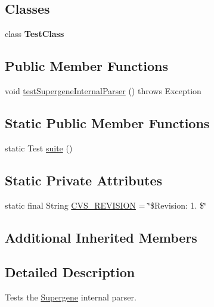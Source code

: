 \subsection*{Classes}
\begin{DoxyCompactItemize}
\item 
class {\bfseries Test\-Class}
\end{DoxyCompactItemize}
\subsection*{Public Member Functions}
\begin{DoxyCompactItemize}
\item 
void \hyperlink{classorg_1_1jgap_1_1supergenes_1_1_supergene_internal_parser_test_aa94a9a335c128bd9ede39479889df217}{test\-Supergene\-Internal\-Parser} ()  throws Exception 
\end{DoxyCompactItemize}
\subsection*{Static Public Member Functions}
\begin{DoxyCompactItemize}
\item 
static Test \hyperlink{classorg_1_1jgap_1_1supergenes_1_1_supergene_internal_parser_test_a045430b5ff1fab9453271d78de8ee82b}{suite} ()
\end{DoxyCompactItemize}
\subsection*{Static Private Attributes}
\begin{DoxyCompactItemize}
\item 
static final String \hyperlink{classorg_1_1jgap_1_1supergenes_1_1_supergene_internal_parser_test_a1625d6d0f39826b53254042aa6644b07}{C\-V\-S\-\_\-\-R\-E\-V\-I\-S\-I\-O\-N} = \char`\"{}\$Revision\-: 1. \$\char`\"{}
\end{DoxyCompactItemize}
\subsection*{Additional Inherited Members}


\subsection{Detailed Description}
Tests the \hyperlink{interfaceorg_1_1jgap_1_1supergenes_1_1_supergene}{Supergene} internal parser. 

